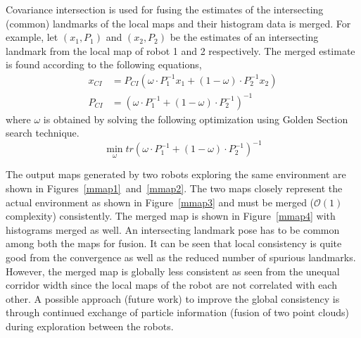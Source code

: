 Covariance intersection is used for fusing the estimates of the intersecting (common) landmarks of the local maps and their histogram data is merged. For example, let $(x_1, P_1)$ and $(x_2, P_2)$ be the estimates of an intersecting landmark from the local map of robot 1 and 2 respectively. The merged estimate is found according to the following equations,
\begin{align}
x_{CI}&=P_{CI}\left(\omega\cdot P^{-1}_1x_1+(1-\omega)\cdot P^{-1}_2x_2\right) \\
P_{CI}&=\left(\omega\cdot P^{-1}_1+(1-\omega)\cdot P_2^{-1}\right)^{-1} 
\end{align} 
where $\omega$ is obtained by solving the following optimization using Golden Section search technique.
\begin{equation}
\min_{\omega} tr\left(\omega\cdot P^{-1}_1+(1-\omega)\cdot P_2^{-1}\right)^{-1}
\end{equation}

The output maps generated by two robots exploring the same environment are shown in Figures~\ref{mmap1}~and~\ref{mmap2}. The two maps closely represent the actual environment as shown in Figure~\ref{mmap3} and must be merged ($\mathcal{O}(1)$ complexity) consistently. The merged map is shown in Figure~\ref{mmap4} with histograms merged as well. An intersecting landmark pose has to be common among both the maps for fusion. It can be seen that local consistency is quite good from the convergence as well as the reduced number of spurious landmarks. However, the merged map is globally less consistent as seen from the unequal corridor width since the local maps of the robot are not correlated with each other. A possible approach (future work) to improve the global consistency is through continued exchange of particle information (fusion of two point clouds) during exploration between the robots. 

